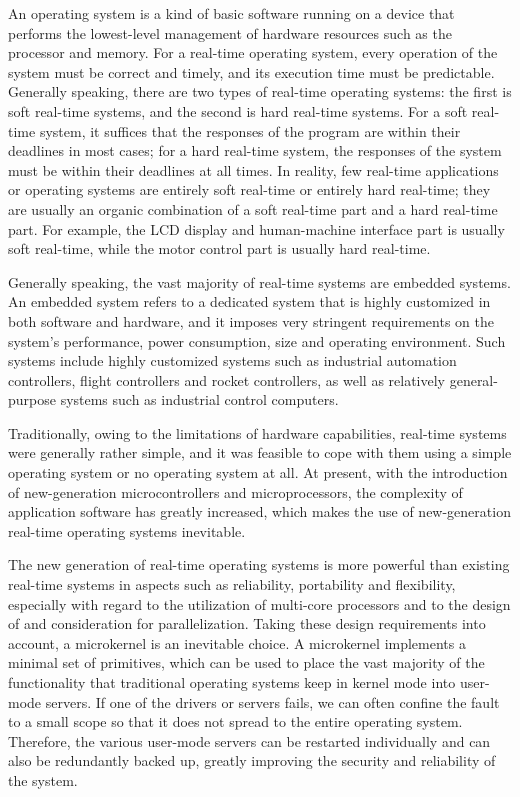An operating system is a kind of basic software running on a device that performs the lowest-level management of hardware resources such as the processor and memory. For a real-time operating system, every operation of the system must be correct and timely, and its execution time must be predictable. Generally speaking, there are two types of real-time operating systems: the first is soft real-time systems, and the second is hard real-time systems. For a soft real-time system, it suffices that the responses of the program are within their deadlines in most cases; for a hard real-time system, the responses of the system must be within their deadlines at all times. In reality, few real-time applications or operating systems are entirely soft real-time or entirely hard real-time; they are usually an organic combination of a soft real-time part and a hard real-time part. For example, the LCD display and human-machine interface part is usually soft real-time, while the motor control part is usually hard real-time.

Generally speaking, the vast majority of real-time systems are embedded systems. An embedded system refers to a dedicated system that is highly customized in both software and hardware, and it imposes very stringent requirements on the system's performance, power consumption, size and operating environment. Such systems include highly customized systems such as industrial automation controllers, flight controllers and rocket controllers, as well as relatively general-purpose systems such as industrial control computers.

Traditionally, owing to the limitations of hardware capabilities, real-time systems were generally rather simple, and it was feasible to cope with them using a simple operating system or no operating system at all. At present, with the introduction of new-generation microcontrollers and microprocessors, the complexity of application software has greatly increased, which makes the use of new-generation real-time operating systems inevitable.

The new generation of real-time operating systems is more powerful than existing real-time systems in aspects such as reliability, portability and flexibility, especially with regard to the utilization of multi-core processors and to the design of and consideration for parallelization. Taking these design requirements into account, a microkernel is an inevitable choice. A microkernel implements a minimal set of primitives, which can be used to place the vast majority of the functionality that traditional operating systems keep in kernel mode into user-mode servers. If one of the drivers or servers fails, we can often confine the fault to a small scope so that it does not spread to the entire operating system. Therefore, the various user-mode servers can be restarted individually and can also be redundantly backed up, greatly improving the security and reliability of the system.

